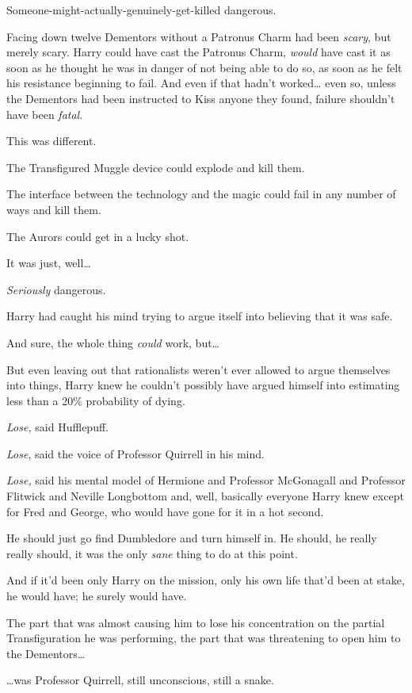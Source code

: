 Someone-might-actually-genuinely-get-killed dangerous.

Facing down twelve Dementors without a Patronus Charm had been \emph{scary}, but merely scary. Harry could have cast the Patronus Charm, \emph{would} have cast it as soon as he thought he was in danger of not being able to do so, as soon as he felt his resistance beginning to fail. And even if that hadn't worked{\ldots} even so, unless the Dementors had been instructed to Kiss anyone they found, failure shouldn't have been \emph{fatal}.

This was different.

The Transfigured Muggle device could explode and kill them.

The interface between the technology and the magic could fail in any number of ways and kill them.

The Aurors could get in a lucky shot.

It was just, well{\ldots}

\emph{Seriously} dangerous.

Harry had caught his mind trying to argue itself into believing that it was safe.

And sure, the whole thing \emph{could} work, but{\ldots}

But even leaving out that rationalists weren't ever allowed to argue themselves into things, Harry knew he couldn't possibly have argued himself into estimating less than a 20\% probability of dying.

\emph{Lose,} said Hufflepuff.

\emph{Lose}, said the voice of Professor Quirrell in his mind.

\emph{Lose,} said his mental model of Hermione and Professor McGonagall and Professor Flitwick and Neville Longbottom and, well, basically everyone Harry knew except for Fred and George, who would have gone for it in a hot second.

He should just go find Dumbledore and turn himself in. He should, he really really should, it was the only \emph{sane} thing to do at this point.

And if it'd been only Harry on the mission, only his own life that'd been at stake, he would have; he surely would have.

The part that was almost causing him to lose his concentration on the partial Transfiguration he was performing, the part that was threatening to open him to the Dementors{\ldots}

{\ldots}was Professor Quirrell, still unconscious, still a snake.

